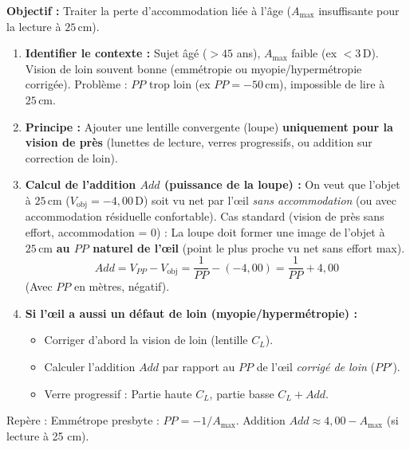 \documentclass[11pt]{article}
\newcommand{\cle}[1]{{\popxbold\color{popdark}#1}}
\begin{document}
\begin{methode}
\textbf{Objectif :} Traiter la perte d'accommodation liée à l'âge ($A_{\text{max}}$ insuffisante pour la lecture à $25\,\text{cm}$).
\begin{enumerate}
    \item \textbf{Identifier le contexte :} Sujet âgé ($>45$ ans), $A_{\text{max}}$ faible (ex $< 3\,\text{D}$). Vision de loin souvent bonne (emmétropie ou myopie/hypermétropie corrigée). Problème : $PP$ trop loin (ex $PP = -50\,\text{cm}$), impossible de lire à $25\,\text{cm}$.
    \item \textbf{Principe :} Ajouter une lentille convergente (loupe) \textbf{uniquement pour la vision de près} (lunettes de lecture, verres progressifs, ou addition sur correction de loin).
    \item \textbf{Calcul de l'addition $Add$ (puissance de la loupe) :}
    On veut que l'objet à $25\,\text{cm}$ ($V_{\text{obj}} = -4,00\,\text{D}$) soit vu net par l'œil \emph{sans accommodation} (ou avec accommodation résiduelle confortable).
    Cas standard (vision de près sans effort, accommodation = 0) : La loupe doit former une image de l'objet à $25\,\text{cm}$ \textbf{au $PP$ naturel de l'œil} (point le plus proche vu net sans effort max).
    \[
    Add = V_{PP} - V_{\text{obj}} = \frac{1}{PP} - (-4,00) = \frac{1}{PP} + 4,00
    \]
    (Avec $PP$ en mètres, négatif).
    \item \textbf{Si l'œil a aussi un défaut de loin (myopie/hypermétropie) :}
    \begin{itemize}
        \item Corriger d'abord la vision de loin (lentille $C_L$).
        \item Calculer l'addition $Add$ par rapport au $PP$ de l'œil \emph{corrigé de loin} ($PP'$).
        \item Verre progressif : Partie haute $C_L$, partie basse $C_L + Add$.
    \end{itemize}
\end{enumerate}
\cle{Repère :} Emmétrope presbyte : $PP = -1/A_{\text{max}}$. Addition $Add \approx 4,00 - A_{\text{max}}$ (si lecture à 25 cm).
\end{methode}
\end{document}
